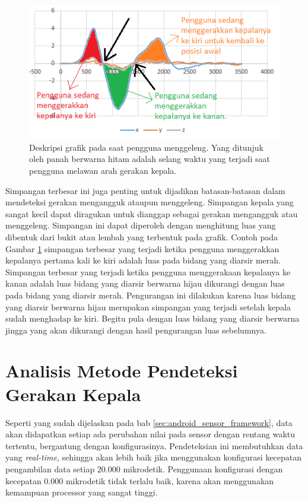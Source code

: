 \begin{figure}[htbp]
\centering
\includegraphics[scale=0.6]{Gambar/grafik-penjelasan-jarak-waktu-melawan-gerakan.png}
\caption{Deskripsi grafik pada saat pengguna menggeleng. Yang ditunjuk oleh panah berwarna hitam adalah selang waktu yang terjadi saat pengguna melawan arah gerakan kepala.} 
\label{fig:grafik-penjelasan-jarak-waktu-melawan-gerakan}
\end{figure}

Simpangan terbesar ini juga penting untuk dijadikan batasan-batasan dalam mendeteksi gerakan mengangguk ataupun menggeleng. Simpangan kepala yang sangat kecil dapat diragukan untuk dianggap sebagai gerakan mengangguk atau menggeleng. Simpangan ini dapat diperoleh dengan menghitung luas yang dibentuk dari bukit atau lembah yang terbentuk pada grafik. Contoh pada Gambar \ref{fig:grafik-penjelasan-jarak-waktu-melawan-gerakan} simpangan terbesar yang terjadi ketika pengguna menggerakkan kepalanya pertama kali ke kiri adalah luas pada bidang yang diarsir merah. Simpangan terbesar yang terjadi ketika pengguna menggerakaan kepalanya ke kanan adalah luas bidang yang diarsir berwarna hijau dikurangi dengan luas pada bidang yang diarsir merah. Pengurangan ini dilakukan karena luas bidang yang diarsir berwarna hijau merupakan simpangan yang terjadi setelah kepala sudah menghadap ke kiri. Begitu pula dengan luas bidang yang diarsir berwarna jingga yang akan dikurangi dengan hasil pengurangan luas sebelumnya.

\section{Analisis Metode Pendeteksi Gerakan Kepala}

Seperti yang sudah dijelaskan pada bab \ref{sec:android_sensor_framework}, data akan didapatkan setiap ada perubahan nilai pada sensor dengan rentang waktu tertentu, bergantung dengan konfigurasinya. Pendeteksian ini membutuhkan data yang \textit{real-time}, sehingga akan lebih baik jika menggunakan konfigurasi kecepatan pengambilan data setiap 20.000 mikrodetik. Penggunaan konfigurasi dengan kecepatan 0.000 mikrodetik tidak terlalu baik, karena akan menggunakan kemampuan processor yang sangat tinggi.

